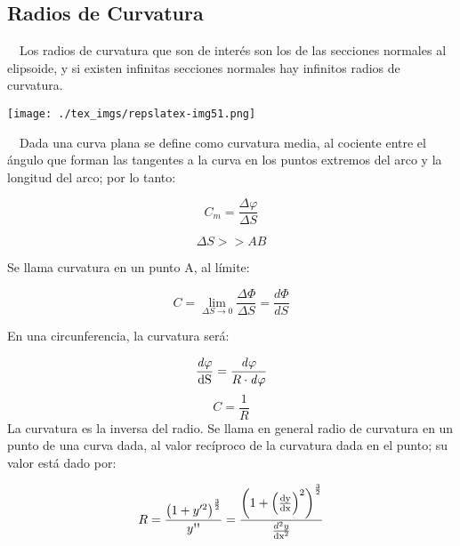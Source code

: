 \documentclass{tufte-book}
\newcommand\normalsubformula[1]{\text{\mathversion{normal}$#1$}}
\begin{document}
\subsection{Radios de Curvatura}

\ \ Los radios de curvatura que son de interés son los de las
secciones normales al elipsoide, y si existen infinitas secciones
normales hay infinitos radios de curvatura.

\begin{marginfigure}
\texttt{[image: ./tex\_imgs/repslatex-img51.png]}
\end{marginfigure}
 

\ \ Dada una curva plana se define como curvatura media, al cociente
entre el ángulo que forman las tangentes a la curva en los puntos
extremos del arco y la longitud del arco; por lo tanto:

\begin{equation*}
{C_{{m}}=\frac{\mathit{\Delta \varphi }}{\mathit{\Delta S}}}
\end{equation*}

\begin{equation*}
\Delta S >> AB
\end{equation*}

Se llama curvatura en un punto A, al límite:

\begin{equation*}
  C = \lim_{\Delta S \to 0} \frac{\Delta \Phi}{\Delta S} = \frac{d \Phi}{dS}
\end{equation*}
 

En una circunferencia, la curvatura será:

\begin{equation*}
{\frac{\mathit{d\varphi
}}{\normalsubformula{\text{dS}}}=\frac{\mathit{d\varphi }}{R\cdot
\mathit{d\varphi }}}
\end{equation*}
\begin{equation*}
{C=\frac{1}{R}}
\end{equation*}
La curvatura es la inversa del radio. Se llama en general radio de
curvatura en un punto de una curva dada, al valor recíproco de la
curvatura dada en el punto; su valor está dado por:

\begin{equation*}
{R=\frac{\left(1+y'^{{2}}\right)^{{\frac{3}{2}}}}{y\text{{\textquotesingle}{\textquotesingle}}}=\frac{\left(1+\left(\frac{\normalsubformula{\text{dy}}}{\normalsubformula{\text{dx}}}\right)^{{2}}\right)^{{\frac{3}{2}}}}{\frac{d^{{2}}y}{\normalsubformula{\text{dx}}^{{2}}}}}
\end{equation*}
\end{document}
